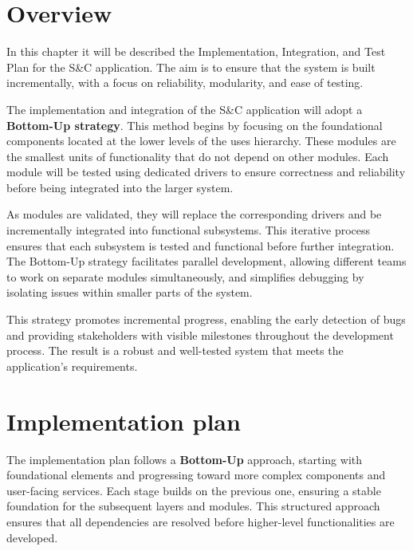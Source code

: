 \section{Overview}

In this chapter it will be described the Implementation, Integration, and Test Plan for the S\&C application. The aim is to ensure that the system is built incrementally, with a focus on reliability, modularity, and ease of testing.

The implementation and integration of the S\&C application will adopt a \textbf{Bottom-Up strategy}. This method begins by focusing on the foundational components located at the lower levels of the uses hierarchy. These modules are the smallest units of functionality that do not depend on other modules. Each module will be tested using dedicated drivers to ensure correctness and reliability before being integrated into the larger system.

As modules are validated, they will replace the corresponding drivers and be incrementally integrated into functional subsystems. This iterative process ensures that each subsystem is tested and functional before further integration. The Bottom-Up strategy facilitates parallel development, allowing different teams to work on separate modules simultaneously, and simplifies debugging by isolating issues within smaller parts of the system.

This strategy promotes incremental progress, enabling the early detection of bugs and providing stakeholders with visible milestones throughout the development process. The result is a robust and well-tested system that meets the application's requirements.

\section{Implementation plan}

The implementation plan follows a \textbf{Bottom-Up} approach, starting with foundational elements and progressing toward more complex components and user-facing services. Each stage builds on the previous one, ensuring a stable foundation for the subsequent layers and modules. This structured approach ensures that all dependencies are resolved before higher-level functionalities are developed.

